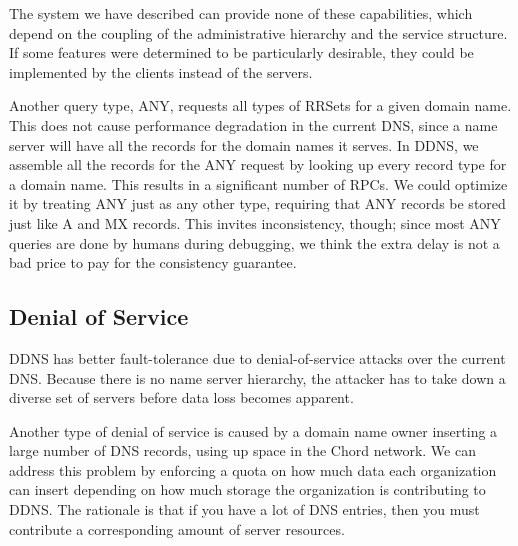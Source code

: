 The system we have described
can provide none of these capabilities, which depend
on the coupling of the administrative hierarchy and the service
structure.
If some features were determined to be particularly desirable,
they could be implemented by the clients instead of the servers.

Another query type, ANY, requests all types of RRSets for
a given domain name. This does not cause performance 
degradation in the current DNS, since a name server
will have all the records for the domain names it serves.
In DDNS, we assemble all the records for the ANY 
request by looking up every record type for a domain 
name.
This results in a significant number of RPCs. 
We could optimize it by treating ANY just as any other type,
requiring that ANY records be stored just like A and MX records.
This invites inconsistency, though; since most ANY queries are
done by humans during debugging, we think the extra
delay is not a bad price to pay for the consistency guarantee.

\subsection{Denial of Service}

DDNS has better fault-tolerance due to denial-of-service attacks 
over the current DNS. 
Because there is no name server hierarchy, the 
attacker has to take down a diverse
set of servers before data loss becomes apparent.

Another type of denial of service is caused by 
a domain name owner inserting a large number 
of DNS records, using up space in the Chord network.
We can address this problem 
by enforcing a quota on how much data each organization
can insert depending on how much storage the organization
is contributing to DDNS. The rationale is that if you
have a lot of DNS entries, then you must contribute a 
corresponding amount of server resources.


